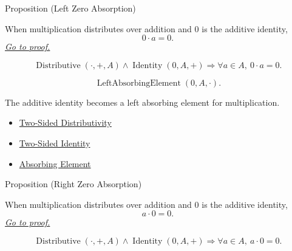 \begin{propositionbox}{Proposition (Left Zero Absorption)}
\begin{proposition}
\label{prop:left-zero-absorption}
When multiplication distributes over addition and $0$ is the additive identity,
\[
0\cdot a=0.
\]
\hyperref[prf:left-zero-absorption]{\textit{Go to proof.}}
\end{proposition}
\end{propositionbox}

\begin{remark*}
\[
\operatorname{Distributive}(\cdot,+,A)
\land
\operatorname{Identity}(0,A,+)
\Longrightarrow
\forall a\in A,\ 0\cdot a=0.
\]
\end{remark*}

\begin{remark*}
\[
\operatorname{LeftAbsorbingElement}(0,A,\cdot).
\]
\end{remark*}

\begin{remark*}[Interpretation]
The additive identity becomes a left absorbing element for multiplication.
\end{remark*}

\begin{dependencies}
\begin{itemize}
  \item \hyperref[def:two-sided-distributivity]{Two-Sided Distributivity}
  \item \hyperref[def:two-sided-identity]{Two-Sided Identity}
  \item \hyperref[def:absorbing-element]{Absorbing Element}
\end{itemize}
\end{dependencies}

\begin{propositionbox}{Proposition (Right Zero Absorption)}
\begin{proposition}
\label{prop:right-zero-absorption}
When multiplication distributes over addition and $0$ is the additive identity,
\[
a\cdot 0=0.
\]
\hyperref[prf:right-zero-absorption]{\textit{Go to proof.}}
\end{proposition}
\end{propositionbox}

\begin{remark*}
\[
\operatorname{Distributive}(\cdot,+,A)
\land
\operatorname{Identity}(0,A,+)
\Longrightarrow
\forall a\in A,\ a\cdot 0=0.
\]
\end{remark*}

